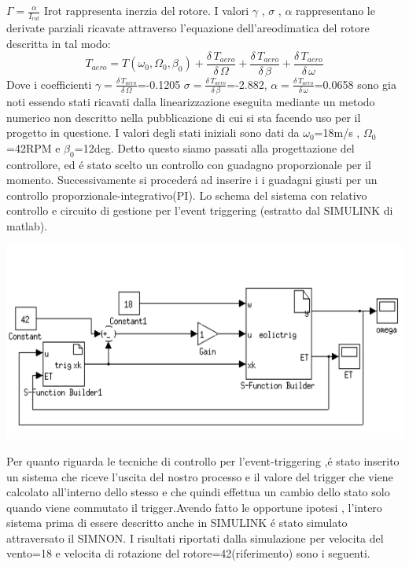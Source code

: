 \documentclass[a4paper,13pt]{article}
\begin{document}
$\Gamma=\frac{\alpha}{I_{rot}}$
Irot rappresenta inerzia del rotore.
I valori $\gamma$ , $\sigma$ , $\alpha$ rappresentano le derivate parziali ricavate attraverso 
l'equazione dell'areodimatica del rotore descritta in tal modo:
\begin{equation}
T_{aero}=T(\omega_0,\Omega_0,\beta_0)+\frac{\delta \, T_{aero}}{\delta \, \Omega}+
\frac{\delta \, T_{aero}}{\delta \, \beta}+\frac{\delta \, T_{aero}}{\delta \, \omega}
\end{equation} 
Dove i coefficienti $\gamma=\frac{\delta \, T_{aero}}{\delta \, \Omega}$=-0.1205
$\sigma=\frac{\delta \, T_{aero}}{\delta \, \beta}$=-2.882,
$\alpha=\frac{\delta \, T_{aero}}{\delta \, \omega}$=0.0658
sono gia noti essendo stati ricavati dalla linearizzazione eseguita mediante un metodo numerico non descritto nella pubblicazione di cui si sta facendo uso per il progetto in questione.
I valori degli stati iniziali sono dati da $\omega_0$=18m/s , $\Omega_0$=42RPM e $\beta_0$=12deg.
Detto questo siamo passati alla progettazione del controllore, ed \'e stato scelto un controllo con guadagno proporzionale per il momento.
Successivamente si proceder\'a ad inserire i i guadagni giusti per un controllo proporzionale-integrativo(PI).
Lo schema del sistema con relativo controllo e circuito di gestione per l'event triggering (estratto dal SIMULINK di matlab).
\begin{center}
\includegraphics[scale=0.6]{schema1.png}
\end{center}
Per quanto riguarda le tecniche di controllo per l'event-triggering ,\'e stato inserito un sistema che riceve l'uscita del nostro processo e il valore del trigger che viene calcolato all'interno dello stesso e che quindi effettua un cambio dello stato solo quando viene commutato il trigger.Avendo fatto le opportune ipotesi , l'intero sistema prima di essere descritto anche in SIMULINK \'e stato simulato attraversato il SIMNON.
I risultati riportati dalla simulazione per velocita del vento=18 e velocita di rotazione del rotore=42(riferimento) sono i seguenti.
\end{document}
